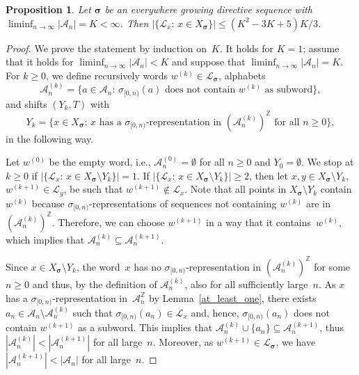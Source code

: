 \documentclass{amsart}
\newtheorem{proposition}[lemma]{Proposition}
\theoremstyle{definition}
\theoremstyle{remark}
\numberwithin{equation}{section}
\begin{document}
\begin{proposition} \label{p:minimalcomponents}
Let $\boldsymbol{\sigma}$ be an everywhere growing directive sequence with  $\liminf_{n\to\infty} |\mathcal{A}_n| = K < \infty$.
Then $|\{\mathcal{L}_x:\, x \in X_{\boldsymbol{\sigma}}\}| \le (K^2-3K+5)K/3$.
\end{proposition}

\begin{proof}
We prove the statement by induction on~$K$.  It holds for $K=1$; assume that it holds for $\liminf_{n\to\infty} |\mathcal{A}_n| < K$ and suppose that $\liminf_{n\to\infty} |\mathcal{A}_n| = K$.
For $k \ge 0$, we define recursively words $w^{(k)} \in \mathcal{L}_{\boldsymbol{\sigma}}$,  alphabets 
\[
\mathcal{A}_n^{(k)} = \{a \in \mathcal{A}_n:\, \mbox{$\sigma_{[0,n)}(a)$ does not contain $w^{(k)}$ as subword}\},
\]
and shifts $(Y_k,T)$ with 
\[
Y_k = \{x \in X_{\boldsymbol{\sigma}}:\, \mbox{$x$ has a $\sigma_{[0,n)}$-representation in $(\mathcal{A}_n^{(k)})^\mathbb{Z}$ for all $n\ge0$}\},
\]
in the following way.

Let $w^{(0)}$ be the empty word, i.e., $\mathcal{A}_n^{(0)} = \emptyset$ for all $n\ge0$ and $Y_0 = \emptyset$.
We stop at $k \ge 0$ if $|\{\mathcal{L}_x:\, x \in X_{\boldsymbol{\sigma}} \setminus Y_k\}| = 1$. 
If $|\{\mathcal{L}_x:\, x \in X_{\boldsymbol{\sigma}} \setminus Y_k\}| \ge 2$, then let $x, y \in X_{\boldsymbol{\sigma}} \setminus Y_k$, $w^{(k+1)} \in \mathcal{L}_y$, be such that $w^{(k+1)} \notin \mathcal{L}_x$.
Note that all points in $X_{\boldsymbol{\sigma}} \setminus Y_k$ contain $w^{(k)}$ because $\sigma_{[0,n)}$-representations of sequences not containing $w^{(k)}$ are in $(\mathcal{A}_n^{(k)})^\mathbb{Z}$.
Therefore, we can choose $w^{(k+1)}$ in a way that it contains~$w^{(k)}$, which implies that $\mathcal{A}_n^{(k)} \subseteq \mathcal{A}_n^{(k+1)}$. 

Since $x \in X_{\boldsymbol{\sigma}} \setminus Y_k$, the word~$x$ has no $\sigma_{[0,n)}$-representation in $(\mathcal{A}_n^{(k)})^\mathbb{Z}$ for some $n\ge0$ and thus, by the definition of $\mathcal{A}_n^{(k)}$, also for all sufficiently large~$n$. 
As $x$ has a $\sigma_{[0,n)}$-representation in~$\mathcal{A}_n^\mathbb{Z}$ by Lemma~\ref{at_least_one}, there exists $a_n \in \mathcal{A}_n \setminus \mathcal{A}_n^{(k)}$ such that $\sigma_{[0,n)}(a_n) \in \mathcal{L}_x$ and, hence, $\sigma_{[0,n)}(a_n)$ does not contain $w^{(k+1)}$ as a subword. 
This implies that $\mathcal{A}_n^{(k)} \cup\{a_n\}\subseteq \mathcal{A}_n^{(k+1)}$, thus
$|\mathcal{A}_n^{(k)}| < |\mathcal{A}_n^{(k+1)}|$ for all large~$n$. 
Moreover, as $w^{(k+1)} \in \mathcal{L}_{\boldsymbol{\sigma}}$, we have $|\mathcal{A}_n^{(k+1)}|< |\mathcal{A}_n|$ for all large~$n$. 


\end{proof}
\end{document}
